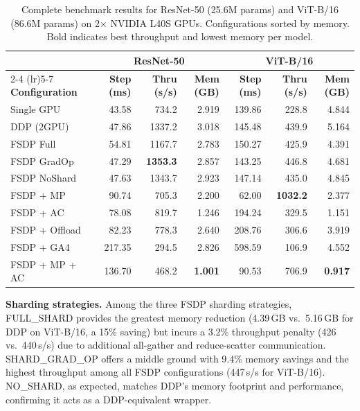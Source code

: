 \documentclass[sigconf]{acmart}
\begin{document}
\begin{table}[t]
\caption{Complete benchmark results for ResNet-50 (25.6M params) and ViT-B/16 (86.6M params) on 2$\times$ NVIDIA L40S GPUs. Configurations sorted by memory. Bold indicates best throughput and lowest memory per model.}
\label{tab:results}
\small
\begin{tabular}{l r r r r r r}
\toprule
& \multicolumn{3}{c}{\textbf{ResNet-50}} & \multicolumn{3}{c}{\textbf{ViT-B/16}} \\
\cmidrule(lr){2-4} \cmidrule(lr){5-7}
\textbf{Configuration} & \textbf{Step (ms)} & \textbf{Thru (s/s)} & \textbf{Mem (GB)} & \textbf{Step (ms)} & \textbf{Thru (s/s)} & \textbf{Mem (GB)} \\
\midrule
Single GPU         &  43.58 &  734.2 & 2.919 & 139.86 &  228.8 & 4.844 \\
DDP (2GPU)         &  47.86 & 1337.2 & 3.018 & 145.48 &  439.9 & 5.164 \\
\midrule
FSDP Full          &  54.81 & 1167.7 & 2.783 & 150.27 &  425.9 & 4.391 \\
FSDP GradOp        &  47.29 & \textbf{1353.3} & 2.857 & 143.25 &  446.8 & 4.681 \\
FSDP NoShard       &  47.63 & 1343.7 & 2.923 & 147.14 &  435.0 & 4.845 \\
FSDP + MP          &  90.74 &  705.3 & 2.200 &  62.00 & \textbf{1032.2} & 2.377 \\
FSDP + AC          &  78.08 &  819.7 & 1.246 & 194.24 &  329.5 & 1.151 \\
FSDP + Offload     &  82.23 &  778.3 & 2.640 & 208.76 &  306.6 & 3.919 \\
FSDP + GA4         & 217.35 &  294.5 & 2.826 & 598.59 &  106.9 & 4.552 \\
FSDP + MP + AC     & 136.70 &  468.2 & \textbf{1.001} &  90.53 &  706.9 & \textbf{0.917} \\
\bottomrule
\end{tabular}
\end{table}

\textbf{Sharding strategies.} Among the three FSDP sharding strategies, FULL\_SHARD provides the greatest memory reduction (4.39\,GB vs.\ 5.16\,GB for DDP on ViT-B/16, a 15\% saving) but incurs a 3.2\% throughput penalty (426 vs.\ 440\,s/s) due to additional all-gather and reduce-scatter communication. SHARD\_GRAD\_OP offers a middle ground with 9.4\% memory savings and the highest throughput among all FSDP configurations (447\,s/s for ViT-B/16). NO\_SHARD, as expected, matches DDP's memory footprint and performance, confirming it acts as a DDP-equivalent wrapper.
\end{document}
